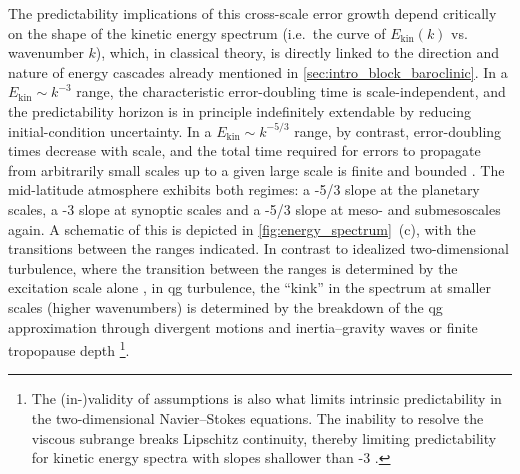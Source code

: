 The predictability implications of this cross-scale error growth depend
critically on the shape of the kinetic energy spectrum (i.e.~the curve of
$E_{\mathrm{kin}}(k)$ vs. wavenumber $k$), which, in classical theory, is directly linked
to the direction and nature of energy cascades already mentioned
in \cref{sec:intro_block_baroclinic}. In a $E_{\mathrm{kin}} \sim k^{-3}$
range, the characteristic error-doubling time is scale-independent, and the
predictability horizon is in principle indefinitely extendable by reducing
initial-condition uncertainty. In a $E_{\mathrm{kin}} \sim k^{-5/3}$
range, by contrast, error-doubling times decrease with scale, and the total
time required for errors to propagate from arbitrarily small scales up to a
given large scale is finite and bounded
\parencite{leithPredictabilityTurbulentFlows1972,
    sunNewTheoreticalFramework2020}.
The mid-latitude atmosphere exhibits
both regimes: a -5/3 slope at the planetary scales, a -3 slope at synoptic
scales and a -5/3 slope at meso- and
submesoscales again. A schematic of this is depicted in
\cref{fig:energy_spectrum}~(c), with the transitions between the ranges indicated.
In contrast to idealized two-dimensional turbulence, where the transition
between the ranges is determined by the excitation scale alone
\parencite{kraichnanInertialRangesTwodimensional1967}, in \gls{qg} turbulence,
the \enquote{kink} in the spectrum at smaller scales (higher wavenumbers)
is determined by the breakdown of
the \gls{qg}
approximation through divergent motions and inertia--gravity waves
\parencite{lindborgEnergyCascadeStrongly2006,
    calliesTransitionGeostrophicTurbulence2014} or finite
tropopause depth \parencite{tullochTheoryAtmosphericEnergy2006}\footnote{The (in-)validity of assumptions is also what limits
    intrinsic predictability in the two-dimensional Navier--Stokes equations.
    The inability to resolve the viscous subrange breaks Lipschitz continuity,
    thereby limiting predictability for kinetic energy spectra with slopes
    shallower than -3
    \parencite{leungAtmosphericPredictabilityRevisiting2019}.}.



